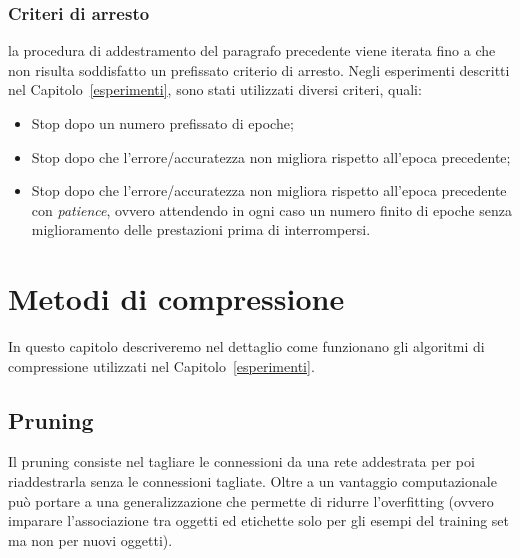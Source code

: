 \documentclass[11pt,a4paper,twoside,
openright]{book}
\begin{document}
\subsection*{Criteri di arresto}
\label{stopping}
la procedura di addestramento del paragrafo precedente viene iterata fino a che non risulta soddisfatto un prefissato criterio di arresto. Negli esperimenti descritti nel Capitolo~\ref{esperimenti}, sono stati utilizzati diversi criteri, quali:

\begin{itemize}
\item Stop dopo un numero prefissato di epoche;
\item Stop dopo che l'errore/accuratezza non migliora rispetto all'epoca precedente;
\item Stop dopo che l'errore/accuratezza non migliora rispetto all'epoca precedente con \textit{patience}, ovvero attendendo in ogni caso un numero finito di epoche senza miglioramento delle prestazioni prima di interrompersi.
\end{itemize}

\chapter{Metodi di compressione}
In questo capitolo descriveremo nel dettaglio come funzionano gli algoritmi di compressione utilizzati nel Capitolo~\ref{esperimenti}.
\section{Pruning}
Il pruning consiste nel tagliare le connessioni da una rete addestrata per poi riaddestrarla senza le connessioni tagliate.
Oltre a un vantaggio computazionale può portare a una generalizzazione che permette di ridurre l'overfitting (ovvero imparare l'associazione tra oggetti ed etichette solo per gli esempi del training set ma non per nuovi oggetti).
\end{document}
